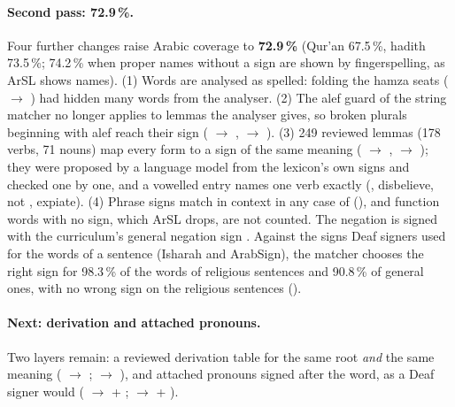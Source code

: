 \paragraph{Second pass: 72.9\,\%.} Four further changes raise Arabic coverage to \textbf{72.9\,\%} (Qur'an 67.5\,\%,
hadith 73.5\,\%; 74.2\,\% when proper names without a sign are shown by fingerspelling, as ArSL shows names). (1) Words are
analysed as spelled: folding the hamza seats ( $\to$ ) had hidden many words from the analyser.
(2) The alef guard of the string matcher no longer applies to lemmas the analyser gives, so broken plurals beginning with
alef reach their sign ( $\to$ ,  $\to$ ). (3) 249 reviewed lemmas (178 verbs, 71 nouns)
map every form to a sign of the same meaning ( $\to$ ,  $\to$ ); they were proposed
by a language model from the lexicon's own signs and checked one by one, and a vowelled entry names one verb exactly
(, disbelieve, not , expiate). (4) Phrase signs match in context in any case of 
(), and function words with no sign, which ArSL drops, are not counted. The negation  is signed with
the curriculum's general negation sign . Against the signs Deaf signers used for the words of a sentence (Isharah and
ArabSign), the matcher chooses the right sign for 98.3\,\% of the words of religious sentences and 90.8\,\% of general
ones, with no wrong sign on the religious sentences ().

\paragraph{Next: derivation and attached pronouns.} Two layers remain: a reviewed derivation table for the same root \emph{and}
the same meaning ( $\to$ ;  $\to$ ), and attached pronouns signed after the word, as a
Deaf signer would ( $\to$  + ;  $\to$  + ).

